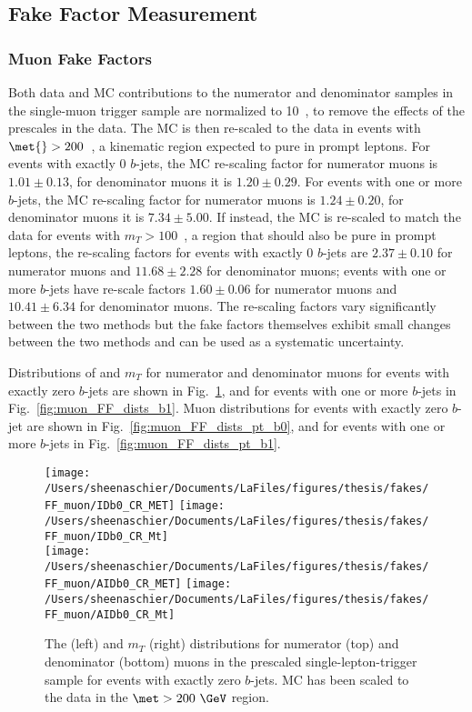   \FloatBarrier
  
 \subsection{Fake Factor Measurement}
 
 
 \subsubsection{Muon Fake Factors}
 Both data and MC contributions to the numerator and denominator samples in the single-muon trigger sample are normalized to 10~\ipb, to remove the effects of the prescales in the data.  The MC is then re-scaled to the data in events with $\met{}>200$~\GeV, a kinematic region expected to pure in prompt leptons.  For events with exactly 0 $b$-jets, the MC re-scaling factor for numerator muons is $1.01 \pm 0.13$, for denominator muons it is $1.20\pm 0.29$. For events with one or more $b$-jets, the MC re-scaling factor for numerator muons is $1.24 \pm 0.20$, for denominator muons it is $7.34\pm 5.00$. If instead, the MC is re-scaled to match the data for events with $m_{T} > 100$~\GeV, a region that should also be pure in prompt leptons, the re-scaling factors for events with exactly 0 $b$-jets are $2.37 \pm 0.10$ for numerator muons and $11.68 \pm 2.28$ for denominator muons; events with one or more $b$-jets have re-scale factors $1.60 \pm 0.06$ for numerator muons and $10.41 \pm 6.34$ for denominator muons. The re-scaling factors vary significantly between the two methods but the fake factors themselves exhibit small changes between the two methods and can be used as a systematic uncertainty.

Distributions of \met{} and $m_{T}$ for numerator and denominator muons for events with exactly zero $b$-jets are shown in Fig.~\ref{fig:muon_FF_dists_b0}, and for events with one or more $b$-jets in Fig.~\ref{fig:muon_FF_dists_b1}.  Muon \pt{} distributions for events with exactly zero $b$-jet are shown in Fig.~\ref{fig:muon_FF_dists_pt_b0}, and for events with one or more $b$-jets in Fig.~\ref{fig:muon_FF_dists_pt_b1}.

\begin{figure}[tbp]
  \centering
  \texttt{[image: /Users/sheenaschier/Documents/LaFiles/figures/thesis/fakes/FF\_muon/IDb0\_CR\_MET]}
  \texttt{[image: /Users/sheenaschier/Documents/LaFiles/figures/thesis/fakes/FF\_muon/IDb0\_CR\_Mt]}\\
  \texttt{[image: /Users/sheenaschier/Documents/LaFiles/figures/thesis/fakes/FF\_muon/AIDb0\_CR\_MET]}
  \texttt{[image: /Users/sheenaschier/Documents/LaFiles/figures/thesis/fakes/FF\_muon/AIDb0\_CR\_Mt]}
  \caption{The \met{} (left) and  $m_{T}$ (right) distributions for numerator (top) and denominator (bottom) muons in the prescaled single-lepton-trigger sample for events with exactly zero $b$-jets.  MC has been scaled to the data in the $\met > 200~\GeV$ region.}
  \label{fig:muon_FF_dists_b0}
\end{figure}

